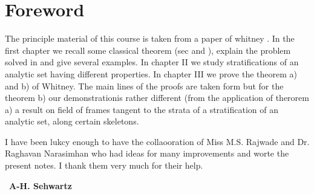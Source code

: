 \chapter{Foreword}


The principle material of this course is taken from a paper of whitney
\cite{key7}. In the first chapter we recall some classical theorem (sec
\cite{key1} and \cite{key2}), explain the problem solved in
\cite{key7} and give several 
examples. In chapter II we study stratifications of an analytic set
having different properties. In chapter III we prove the theorem a)
and b) of Whitney. The main lines of the proofs are taken form \cite{key7}
but for the theorem b) our demonstrationis rather different (from the
application of therorem a) a result on field of frames tangent to the
strata of a stratification of an analytic set, along certain
skeletons. 

I have been lukcy enough to have the collaooration of Miss
M.S. Rajwade and Dr. Raghavan Narasimhan who had ideas for many
improvements and worte the present notes. I thank them very much for
their help. 

\bigskip
~\hfill{\large\bf A-H. Sehwartz}
